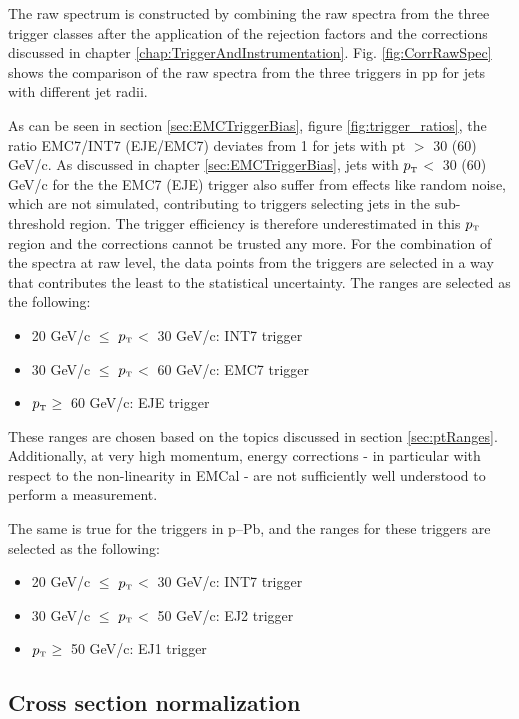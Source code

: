 \documentclass[ALICE]{ALICE_analysis_notes}
\newcommand{\pT}{$p_{\mbox{\tiny T}}$\xspace}
\newcommand{\pPb}{{\mbox{p--Pb}}\xspace}
\newcommand{\pp}{pp\xspace}
\begin{document}
The raw spectrum is constructed by combining the raw spectra from the three trigger classes after the application of the rejection factors and the corrections discussed in chapter \ref{chap:TriggerAndInstrumentation}. Fig. \ref{fig:CorrRawSpec} shows the comparison of the raw spectra from the three triggers in \pp for jets with different jet radii. 

As can be seen in section \ref{sec:EMCTriggerBias}, figure \ref{fig:trigger_ratios}, the ratio EMC7/INT7 (EJE/EMC7) deviates from 1 for jets with pt $>$ 30 (60) GeV/c. As discussed in chapter \ref{sec:EMCTriggerBias}, jets with \pT $<$ 30 (60) GeV/c for the the EMC7 (EJE) trigger also suffer from effects like random noise, which are not simulated, contributing to triggers selecting jets in the sub-threshold region. The trigger efficiency is therefore underestimated in this \pT region and the corrections cannot be trusted any more. For the combination of the spectra at raw level, the data points from the triggers are selected in a way that contributes the least to the statistical uncertainty. The ranges are selected as the following:

\begin{itemize}
    \item 20 GeV/c $\le$ \pT $<$ 30 GeV/c: INT7 trigger
    \item 30 GeV/c $\le$ \pT $<$ 60 GeV/c: EMC7 trigger
    \item \pT $\ge$ 60 GeV/c: EJE trigger
\end{itemize}

These ranges are chosen based on the topics discussed in section \ref{sec:ptRanges}. Additionally, at very high momentum, energy corrections - in particular with respect to the non-linearity in EMCal - are not sufficiently well understood to perform a measurement.

The same is true for the triggers in \pPb, and the ranges for these triggers are selected as the following:

\begin{itemize}
    \item 20 GeV/c $\le$ \pT $<$ 30 GeV/c: INT7 trigger
    \item 30 GeV/c $\le$ \pT $<$ 50 GeV/c: EJ2 trigger
    \item \pT $\ge$ 50 GeV/c: EJ1 trigger
\end{itemize}

\subsection{Cross section normalization}
\label{sec:xsecNomalization}
\end{document}
